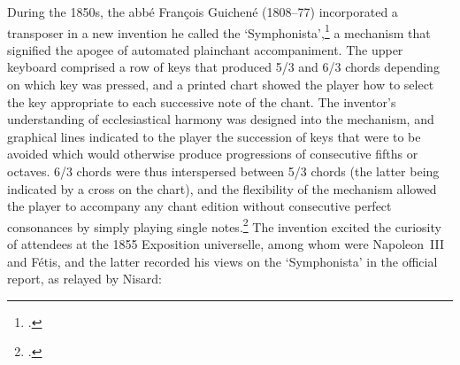 %
During the 1850s, the abbé François Guichené (1808--77) incorporated a transposer in a new invention he called the `Symphonista',\footcites[207]{LessmannRezeptiongregorianischenChorals2016}[4--5]{DouglassCavailleCollmusiciansdocumented1980} a mechanism that signified the apogee of automated plainchant accompaniment.
The upper keyboard comprised a row of keys that produced 5/3 and 6/3 chords depending on which key was pressed, and a printed chart showed the player how to select the key appropriate to each successive note of the chant.
The inventor's understanding of ecclesiastical harmony was designed into the mechanism, and graphical lines indicated to the player the succession of keys that were to be avoided which would otherwise produce progressions of consecutive fifths or octaves.
6/3 chords were thus interspersed between 5/3 chords (the latter being indicated by a cross on the chart), and the flexibility of the mechanism allowed the player to accompany any chant edition without consecutive perfect consonances by simply playing single notes.\footcite[297--301; Elevation, cross-section and plan views of the `Symphonista' are printed on plate 177]{ArmengaudSystemeharmoniquedit1856}
The invention excited the curiosity of attendees at the 1855 Exposition universelle, among whom were Napoleon~III and Fétis, and the latter recorded his views on the `Symphonista' in the official report, as relayed by Nisard:
\nowidow[2]

